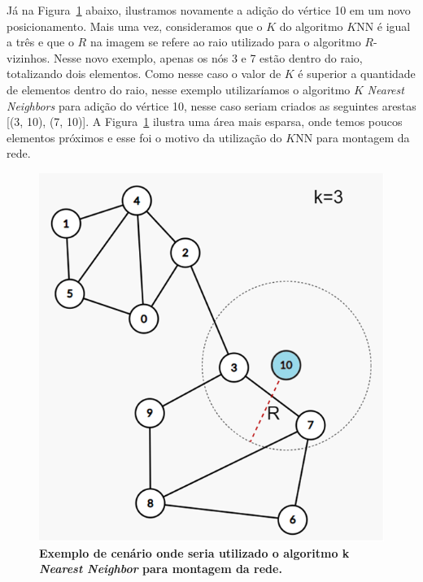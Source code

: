 \documentclass[
12pt,        %
oneside,     %
a4paper,     %
english,       %
brazil        %
%
%
]{ppgca}
\begin{document}
Já na Figura~\ref{fig:knn} abaixo, ilustramos novamente a adição do vértice 10 em um novo posicionamento. Mais uma vez, consideramos que o $K$ do algoritmo $K$NN é igual a três e que o $R$ na imagem se refere ao raio utilizado para o algoritmo $R$-vizinhos. Nesse novo exemplo, apenas os nós 3 e 7 estão dentro do raio, totalizando dois elementos. Como nesse caso o valor de $K$ é superior a quantidade de elementos dentro do raio, nesse exemplo utilizaríamos o algoritmo $K$ \textit{Nearest Neighbors} para adição do vértice 10, nesse caso seriam criados as seguintes arestas [(3, 10), (7, 10)]. A Figura~\ref{fig:knn} ilustra uma área mais esparsa, onde temos poucos elementos próximos e esse foi o motivo da utilização do $K$NN para montagem da rede.

\begin{figure}[H]
    \includegraphics[scale=0.6]{knn.png}
    \centering
    \caption{\textbf{Exemplo de cenário onde seria utilizado o algoritmo k \textit{Nearest Neighbor} para montagem da rede.}}
    \label{fig:knn}
\end{figure}
\end{document}
